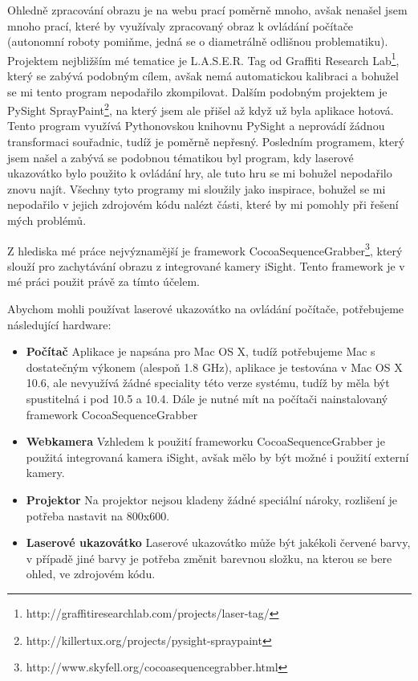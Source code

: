 \documentclass[twoside,12pt]{article}
\begin{document}
Ohledně zpracování obrazu je na webu prací poměrně mnoho, avšak nenašel jsem mnoho prací, které by využívaly zpracovaný obraz k ovládání počítače (autonomní roboty pomiňme, jedná se o diametrálně odlišnou problematiku). Projektem nejbližším mé tematice je L.A.S.E.R. Tag od Graffiti Research Lab\footnote{http://graffitiresearchlab.com/projects/laser-tag/}, který se zabývá podobným cílem, avšak nemá automatickou kalibraci a bohužel se mi tento program nepodařilo zkompilovat. Dalším podobným projektem je PySight SprayPaint\footnote{http://killertux.org/projects/pysight-spraypaint}, na který jsem ale přišel až když už byla aplikace hotová. Tento program využívá Pythonovskou knihovnu PySight a neprovádí žádnou transformaci souřadnic, tudíž je poměrně nepřesný. Posledním programem, který jsem našel a zabývá se podobnou tématikou byl program, kdy laserové ukazovátko bylo použito k ovládání hry, ale tuto hru se mi bohužel nepodařilo znovu najít. Všechny tyto programy mi sloužily jako inspirace, bohužel se mi nepodařilo v jejich zdrojovém kódu nalézt části, které by mi pomohly při řešení mých problémů. 

Z hlediska mé práce nejvýznamější je framework CocoaSequenceGrabber\footnote{http://www.skyfell.org/cocoasequencegrabber.html}, který slouží pro zachytávání obrazu z integrované kamery iSight. Tento framework je v mé práci použit právě za tímto účelem.

Abychom mohli používat laserové ukazovátko na ovládání počítače, potřebujeme následující hardware:
\begin{itemize}
 \item{\bf Počítač} Aplikace je napsána pro Mac OS X, tudíž potřebujeme Mac s dostatečným výkonem (alespoň 1.8 GHz), aplikace je testována v Mac OS X 10.6, ale nevyužívá žádné speciality této verze systému, tudíž by měla být spustitelná i pod 10.5 a 10.4. Dále je nutné mít na počítači nainstalovaný framework CocoaSequenceGrabber
 \item{\bf Webkamera} Vzhledem k použití frameworku CocoaSequenceGrabber je použitá integrovaná kamera iSight, avšak mělo by být možné i použití externí kamery. 
\item{\bf Projektor} Na projektor nejsou kladeny žádné speciální nároky, rozlišení je potřeba nastavit na 800x600.
\item{\bf Laserové ukazovátko} Laserové ukazovátko může být jakékoli červené barvy, v případě jiné barvy je potřeba změnit barevnou složku, na kterou se bere ohled, ve zdrojovém kódu.
\end{itemize}
\end{document}
